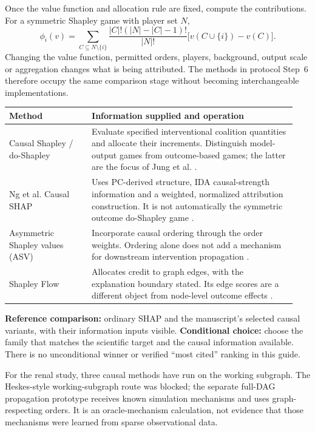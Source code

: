 \documentclass[11pt,letterpaper]{article}
\begin{document}
Once the value function and allocation rule are fixed, compute the contributions. For a symmetric Shapley game with player set $N$,
\[
 \phi_i(v)=\sum_{C\subseteq N\setminus\{i\}}
 \frac{|C|!(|N|-|C|-1)!}{|N|!}
 \bigl[v(C\cup\{i\})-v(C)\bigr].
\]
Changing the value function, permitted orders, players, background, output scale or aggregation changes what is being attributed. The methods in protocol Step~6 therefore occupy the same comparison stage without becoming interchangeable implementations.

\begingroup\small\setlength{\tabcolsep}{5pt}
\begin{longtable}{@{}L{0.27\linewidth}L{0.67\linewidth}@{}}
\toprule Method & Information supplied and operation\\\midrule\endhead
Causal Shapley / do-Shapley & Evaluate specified interventional coalition quantities and allocate their increments. Distinguish model-output games from outcome-based games; the latter are the focus of Jung et al. \citep{Heskes2020,Jung2022}.\\[5pt]
Ng et al. Causal SHAP & Uses PC-derived structure, IDA causal-strength information and a weighted, normalized attribution construction. It is not automatically the symmetric outcome do-Shapley game \citep{Ng2025}.\\[5pt]
Asymmetric Shapley values (ASV) & Incorporate causal ordering through the order weights. Ordering alone does not add a mechanism for downstream intervention propagation \citep{Frye2020}.\\[5pt]
Shapley Flow & Allocates credit to graph edges, with the explanation boundary stated. Its edge scores are a different object from node-level outcome effects \citep{Wang2021}.\\
\bottomrule
\end{longtable}\endgroup

\textbf{Reference comparison:} ordinary SHAP and the manuscript's selected causal variants, with their information inputs visible. \textbf{Conditional choice:} choose the family that matches the scientific target and the causal information available. There is no unconditional winner or verified ``most cited'' ranking in this guide.

For the renal study, three causal methods have run on the working subgraph. The Heskes-style working-subgraph route was blocked; the separate full-DAG propagation prototype receives known simulation mechanisms and uses graph-respecting orders. It is an oracle-mechanism calculation, not evidence that those mechanisms were learned from sparse observational data.
\end{document}
